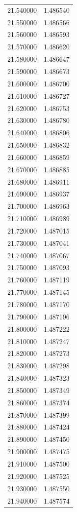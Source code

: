 \begin{tabular}{rr}
21.540000 & 1.486540 \\
21.550000 & 1.486566 \\
21.560000 & 1.486593 \\
21.570000 & 1.486620 \\
21.580000 & 1.486647 \\
21.590000 & 1.486673 \\
21.600000 & 1.486700 \\
21.610000 & 1.486727 \\
21.620000 & 1.486753 \\
21.630000 & 1.486780 \\
21.640000 & 1.486806 \\
21.650000 & 1.486832 \\
21.660000 & 1.486859 \\
21.670000 & 1.486885 \\
21.680000 & 1.486911 \\
21.690000 & 1.486937 \\
21.700000 & 1.486963 \\
21.710000 & 1.486989 \\
21.720000 & 1.487015 \\
21.730000 & 1.487041 \\
21.740000 & 1.487067 \\
21.750000 & 1.487093 \\
21.760000 & 1.487119 \\
21.770000 & 1.487145 \\
21.780000 & 1.487170 \\
21.790000 & 1.487196 \\
21.800000 & 1.487222 \\
21.810000 & 1.487247 \\
21.820000 & 1.487273 \\
21.830000 & 1.487298 \\
21.840000 & 1.487323 \\
21.850000 & 1.487349 \\
21.860000 & 1.487374 \\
21.870000 & 1.487399 \\
21.880000 & 1.487424 \\
21.890000 & 1.487450 \\
21.900000 & 1.487475 \\
21.910000 & 1.487500 \\
21.920000 & 1.487525 \\
21.930000 & 1.487550 \\
21.940000 & 1.487574 \\

\end{tabular}
